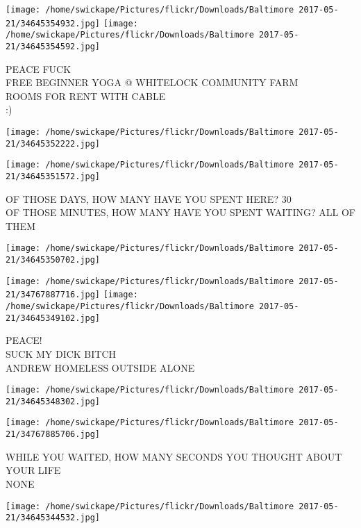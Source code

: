 \documentclass[10pt,letterpaper]{article}
\begin{document}
\texttt{[image: /home/swickape/Pictures/flickr/Downloads/Baltimore 2017-05-21/34645354932.jpg]}
\texttt{[image: /home/swickape/Pictures/flickr/Downloads/Baltimore 2017-05-21/34645354592.jpg]}

PEACE FUCK\\
FREE BEGINNER YOGA @ WHITELOCK COMMUNITY FARM\\
ROOMS FOR RENT WITH CABLE\\
:)\\
\pagebreak

\texttt{[image: /home/swickape/Pictures/flickr/Downloads/Baltimore 2017-05-21/34645352222.jpg]}

\vspace{0.25in}
\texttt{[image: /home/swickape/Pictures/flickr/Downloads/Baltimore 2017-05-21/34645351572.jpg]}

OF THOSE DAYS, HOW MANY HAVE YOU SPENT HERE?  30\\
OF THOSE MINUTES, HOW MANY HAVE YOU SPENT WAITING?  ALL OF THEM\\
\pagebreak

\texttt{[image: /home/swickape/Pictures/flickr/Downloads/Baltimore 2017-05-21/34645350702.jpg]}

\vspace{0.25in}
\texttt{[image: /home/swickape/Pictures/flickr/Downloads/Baltimore 2017-05-21/34767887716.jpg]}
\texttt{[image: /home/swickape/Pictures/flickr/Downloads/Baltimore 2017-05-21/34645349102.jpg]}

PEACE!\\
SUCK MY DICK BITCH\\
ANDREW HOMELESS OUTSIDE ALONE\\
\pagebreak

\texttt{[image: /home/swickape/Pictures/flickr/Downloads/Baltimore 2017-05-21/34645348302.jpg]}

\vspace{0.25in}
\texttt{[image: /home/swickape/Pictures/flickr/Downloads/Baltimore 2017-05-21/34767885706.jpg]}

WHILE YOU WAITED, HOW MANY SECONDS YOU THOUGHT ABOUT YOUR LIFE\\
NONE\\
\pagebreak

\texttt{[image: /home/swickape/Pictures/flickr/Downloads/Baltimore 2017-05-21/34645344532.jpg]}
\end{document}
